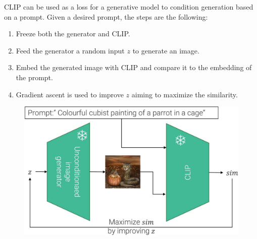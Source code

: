 \begin{remark}
    CLIP can be used as a loss for a generative model to condition generation based on a prompt. Given a desired prompt, the steps are the following:
    \begin{enumerate}
        \item Freeze both the generator and CLIP.
        \item Feed the generator a random input $z$ to generate an image.
        \item Embed the generated image with CLIP and compare it to the embedding of the prompt.
        \item Gradient ascent is used to improve $z$ aiming to maximize the similarity.
    \end{enumerate}

    \begin{figure}[H]
        \centering
        \includegraphics[width=0.5\linewidth]{./img/_clip_generation_conditioning.jpg}
    \end{figure}
\end{remark}